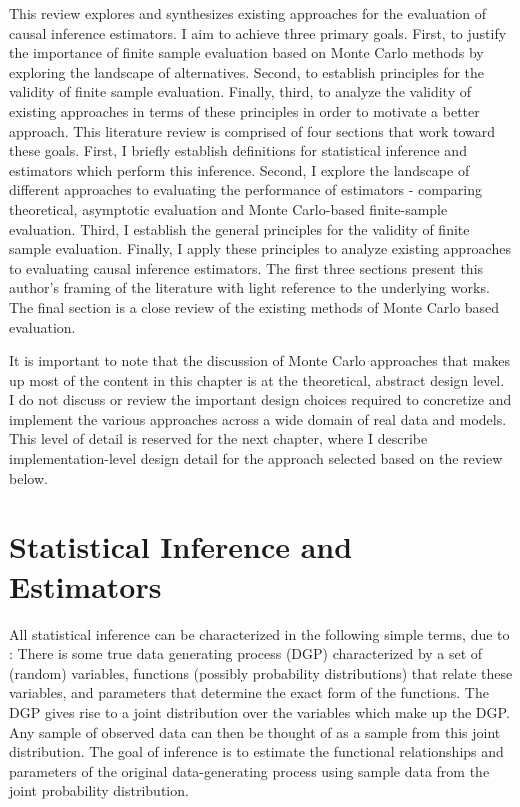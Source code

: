 \documentclass[../main.tex]{subfiles}
\begin{document}
This review explores and synthesizes existing approaches for the evaluation of causal inference estimators. I aim to achieve three primary goals. First, to justify the importance of finite sample evaluation based on Monte Carlo methods by exploring the landscape of alternatives. Second, to establish principles for the validity of finite sample evaluation. Finally, third, to analyze the validity of existing approaches in terms of these principles in order to motivate a better approach. This literature review is comprised of four sections that work toward these goals. First, I briefly establish definitions for statistical inference and estimators which perform this inference. Second, I explore the landscape of different approaches to evaluating the performance of estimators - comparing theoretical, asymptotic evaluation and Monte Carlo-based finite-sample evaluation. Third, I establish the general principles for the validity of finite sample evaluation. Finally, I apply these principles to analyze existing approaches to evaluating causal inference estimators. The first three sections present this author’s framing of the literature with light reference to the underlying works. The final section is a close review of the existing methods of Monte Carlo based evaluation.

\vspace{\baselineskip}

It is important to note that the discussion of Monte Carlo approaches that makes up most of the content in this chapter is at the theoretical, abstract design level. I do not discuss or review the important design choices required to concretize and implement the various approaches across a wide domain of real data and models. This level of detail is reserved for the next chapter, where I describe implementation-level design detail for the approach selected based on the review below.

\section{Statistical Inference and Estimators}

\vspace{\baselineskip}
All statistical inference can be characterized in the following simple terms, due to \textcite{Pearl2009CausalOverview}: There is some true data generating process (DGP) characterized by a set of (random) variables, functions (possibly probability distributions) that relate these variables, and parameters that determine the exact form of the functions. The DGP gives rise to a joint distribution over the variables which make up the DGP. Any sample of observed data can then be thought of as a sample from this joint distribution. The goal of inference is to estimate the functional relationships and parameters of the original data-generating process using sample data from the joint probability distribution.\par
\end{document}
